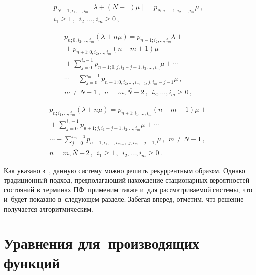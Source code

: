 \begin{multicols}{2}
\vspace*{-12pt}

\noindent
\begin{multline}
\label{bat-4}
p_{N-1;i_1,\ldots,i_{m}} [\lambda+(N-1)\mu]
=
p_{N;i_1-1,i_2,\ldots,i_{m}} \mu\,,\\ 
i_1\ge 1\,,\ \ i_2,\ldots,i_{m}\ge 0\,,
\end{multline}

\vspace*{-12pt}

\noindent
\begin{multline}
\label{bat-5}
p_{n;0,i_2,\ldots,i_{m}} (\lambda+n\mu)
= p_{n-1;i_2,\ldots,i_{m}} \lambda
+{}\\
{}+
p_{n+1;0,i_2,\ldots,i_{m}} (n-m+1) \mu
+{}\\
{}+
\sum\limits_{j=0}^{i_2-1}
p_{n+1;0,j,i_2-j-1,i_3,\ldots,i_{m}} \mu
+ \cdots{}\\
{}\cdots + \sum\limits_{j=0}^{i_m-1} p_{n+1;0,i_2,\ldots,i_{m-1},j,i_m-j-1} \mu\,,\\ 
m\ne N-1\,, \ \ n=\overline{m,N-2}\,,\ \ i_2,\ldots,i_{m} \ge 0\,;
\end{multline}

\vspace*{-12pt}

\noindent
\begin{multline}
\label{bat-6}
p_{n;i_1,\ldots,i_{m}} (\lambda+n\mu)
= p_{n+1;i_1,\ldots,i_{m}} (n-m+1) \mu
+ {}\\
{}+\sum\limits_{j=0}^{i_1-1} p_{n+1;j,i_1-j-1,i_2,\ldots,i_{m}} \mu
+  \cdots {}\\
{}\cdots +
\sum\limits_{j=0}^{i_m-1} p_{n+1;i_1,\ldots,i_{m-1},j,i_m-j-1,} \mu\,,\ \  
m\ne N-1\,,\\
 n=\overline{m,N-2}\,,\ \ i_1 \ge 1\,,\ \ i_2,\ldots,i_{m}\ge 0\,.
\end{multline}

Как указано в~\cite{pr2015}, данную систему можно решить рекуррентным образом.
Однако традиционный подход, предполагающий нахождение
стационарных вероятностей состояний
в~терминах ПФ, применим также и~для рас\-смат\-ри\-ва\-емой системы,
что и~будет показано в~сле\-ду\-ющем разделе.
Забегая вперед, отметим, что решение получается алгоритмическим.

\section{Уравнения для~производящих функций}


\end{multicols}
